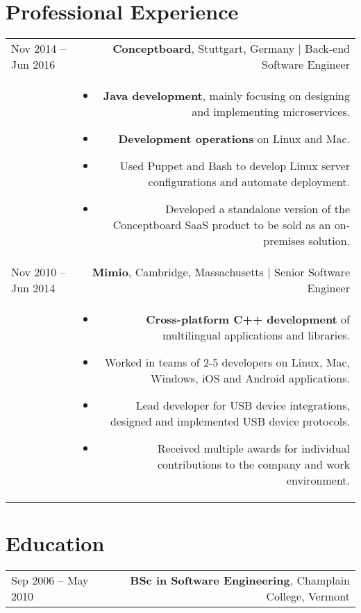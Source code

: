 \documentclass[10pt]{article}
\begin{document}
\section*{Professional Experience}
\begin{tabular}{L!{}R}
Nov 2014 -- Jun 2016&{\bf Conceptboard}, Stuttgart, Germany | Back-end Software Engineer\\
&\begin{itemize}
  \item {\bf Java development}, mainly focusing on designing and implementing microservices.
  \item {\bf Development operations} on Linux and Mac.
  \item Used Puppet and Bash to develop Linux server configurations and automate deployment.
  \item Developed a standalone version of the Conceptboard SaaS product to be sold as an on-premises solution.
\end{itemize}\\
Nov 2010 -- Jun 2014&{\bf Mimio}, Cambridge, Massachusetts | Senior Software Engineer\\
&\begin{itemize}
  \item {\bf Cross-platform C++ development} of multilingual applications and libraries.
  \item Worked in teams of 2-5 developers on Linux, Mac, Windows, iOS and Android applications.
  \item Lead developer for USB device integrations, designed and implemented USB device protocols.
  \item Received multiple awards for individual contributions to the company and work environment.
\end{itemize}\\
\end{tabular}

\section*{Education}
\begin{tabular}{L!{}R}
Sep 2006 -- May 2010&{\bf BSc in Software Engineering}, Champlain College, Vermont\\
\end{tabular}
\end{document}
